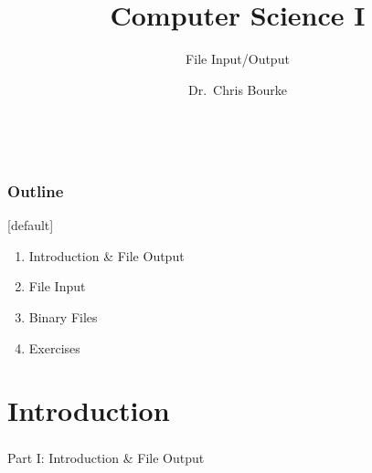 \documentclass[]{beamer}
\title[~]{Computer Science I}
\subtitle{File Input/Output}
\author[~]{Dr.\ Chris Bourke\\ \email{cbourke@cse.unl.edu}} %
\date{~}
\begin{document}
\begin{frame}
  \titlepage
\end{frame}


\begin{frame}
  \frametitle{Outline}

[default]
\begin{enumerate}
  \item Introduction \& File Output
  \item File Input
  \item Binary Files
  \item Exercises
\end{enumerate}

\end{frame}

\section{Introduction}

\begin{frame}
    \frametitle{}
    \framesubtitle{}
    
    \begin{center}
    {\Huge Part I: Introduction \& File Output}\\
    {\Large ~}
    \end{center}

\end{frame}
\end{document}
